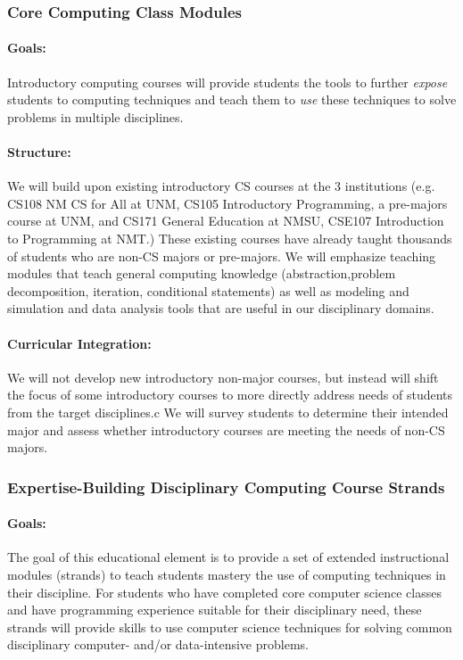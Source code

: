 \subsubsection{Core Computing Class Modules}
\paragraph{Goals:} Introductory computing courses will provide  students the tools to further \emph{expose} students to computing techniques and teach them to \emph{use} these techniques to solve problems in multiple disciplines.

\paragraph{Structure:} We will build upon existing introductory CS courses at the 3 institutions (e.g. CS108 NM CS for All at UNM, CS105 Introductory Programming, a pre-majors course at UNM, and CS171 General Education at NMSU, CSE107 Introduction to Programming at NMT.) These existing courses have already taught thousands of students who are non-CS majors or pre-majors. We will emphasize teaching modules that teach general computing knowledge (abstraction,problem decomposition, iteration, conditional statements) as well as modeling and simulation and data analysis tools that are useful in our disciplinary domains.

\paragraph{Curricular Integration:}
We will not develop new introductory non-major courses, but instead will shift the focus of some introductory courses to more directly address needs of students from the target disciplines.c We will survey students to determine their intended major and assess whether introductory courses are meeting the needs of non-CS majors.

\subsubsection{Expertise-Building Disciplinary Computing Course Strands}
\paragraph{Goals:} The goal of this educational element is to provide a set of extended instructional modules (strands) to teach students mastery the use of computing techniques in their discipline. For students who have completed core computer science classes and have programming experience suitable for their disciplinary need, these strands will provide skills to use computer science techniques for solving common disciplinary computer- and/or data-intensive problems. 

